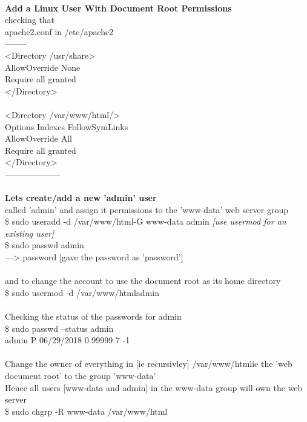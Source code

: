 \documentclass[10pt,a4paper]{article}
\begin{document}
{{{{{{{{{{{{{{{{{{{{\\
\textbf{Add a Linux User With Document Root Permissions}}{\large \\
checking that\\
apache2.conf in /etc/apache2}{\large  \\
--------\\
<Directory /usr/share>}{\large \\
        AllowOverride None\\
        Require all granted\\
</Directory>\\
\\
<Directory /var/www/html/>}{\large \\
        Options Indexes FollowSymLinks\\
        AllowOverride All\\
        Require all granted\\
</Directory>\\
--------------------\\
\\
\textbf{Lets create/add a new 'admin' user}}{\large  \\
called 'admin' and assign it permissions to the 'www-data' web server group\\
\$ sudo useradd -d /var/www/html}{\large  -G www-data admin     \textit{[use usermod for an existing user]}}{\large \\
\$ sudo passwd admin\\
---> password    [gave the password as 'password']\\
\\
and to change the account to use the document root as its home directory\\
\$ sudo usermod -d /var/www/html}{\large  admin\\
\\
Checking the status of the passwords for admin\\
\$ sudo passwd --status admin\\
admin P 06/29/2018 0 99999 7 -1\\
\\
Change the owner of everything in [ie recursivley] /var/www/html}{\large  ie the 'web document root' to the group 'www-data'\\
Hence all users [www-data and admin] in the www-data group will own the web server\\
\$ sudo chgrp -R www-data /var/www/html}{\large \\
\\
}}}}}}}}}}}}}}}}}}}}
\end{document}
